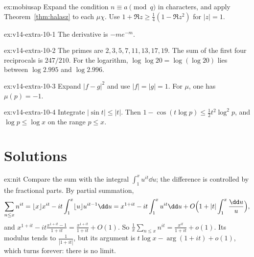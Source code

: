 \begin{hint}{ex:mobiusap}
Expand the condition $n\equiv a\pmod q$ in characters, and apply Theorem~\ref{thm:halasz} to each $\mu\chi$. Use $1+\Re z\ge\frac14(1-\Re z^2)$ for $|z|=1$.
\end{hint}

\begin{hint}{ex:v14-extra-10-1}
The derivative is $-me^{-m}$.
\end{hint}

\begin{hint}{ex:v14-extra-10-2}
The primes are $2,3,5,7,11,13,17,19$. The sum of the first four reciprocals is $247/210$. For the logarithm, $\log\log20=\log(\log20)$ lies between $\log2.995$ and $\log2.996$.
\end{hint}

\begin{hint}{ex:v14-extra-10-3}
Expand $|f-g|^2$ and use $|f|=|g|=1$. For $\mu$, one has $\mu(p)=-1$.
\end{hint}

\begin{hint}{ex:v14-extra-10-4}
Integrate $|\sin t|\le|t|$. Then $1-\cos(t\log p)\le\frac12 t^2\log^2 p$, and $\log p\le\log x$ on the range $p\le x$.
\end{hint}

\section{Solutions}

\begin{solution}{ex:nit}
\idea Compare the sum with the integral $\int_1^xu^{it}\dd u$; the difference is controlled by the fractional parts.
\writeup By partial summation,
\[
\sum_{n\le x}n^{it}=\lfloor x\rfloor x^{it}-it\int_1^x\lfloor u\rfloor u^{it-1}\dd u=x^{1+it}-it\int_1^xu^{it}\dd u+O\Bigl(1+|t|\int_1^x\frac{\dd u}u\Bigr),
\]
and $x^{1+it}-it\frac{x^{1+it}-1}{1+it}=\frac{x^{1+it}}{1+it}+O(1)$. So $\frac1x\sum_{n\le x}n^{it}=\frac{x^{it}}{1+it}+o(1)$. Its modulus tends to $\frac1{|1+it|}$, but its argument is $t\log x-\arg(1+it)+o(1)$, which turns forever: there is no limit.
\end{solution}

